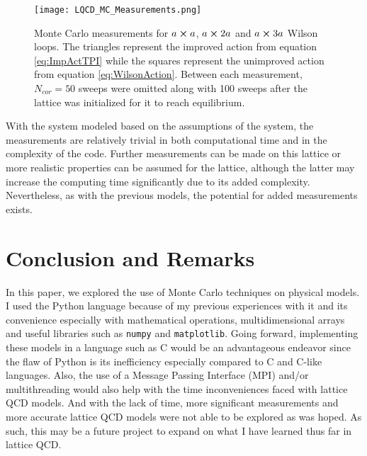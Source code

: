 \documentclass[11pt]{article}
\begin{document}
\begin{figure}[h!]
	\centering
	\texttt{[image: LQCD\_MC\_Measurements.png]}
	\caption{Monte Carlo measurements for $a\cross a$, $a\cross2a$ and $a\cross3a$ Wilson loops. The triangles represent the improved action from equation \ref{eq:ImpActTPI} while the squares represent the unimproved action from equation \ref{eq:WilsonAction}. Between each measurement, $N_{cor}=50$ sweeps were omitted along with 100 sweeps after the lattice was initialized for it to reach equilibrium.}
	\label{fig:LQCDPlot}
\end{figure}

With the system modeled based on the assumptions of the system, the measurements are relatively trivial in both computational time and in the complexity of the code. Further measurements can be made on this lattice or more realistic properties can be assumed for the lattice, although the latter may increase the computing time significantly due to its added complexity. Nevertheless, as with the previous models, the potential for added measurements exists.

\section{Conclusion and Remarks}
In this paper, we explored the use of Monte Carlo techniques on physical models. I used the Python language because of my previous experiences with it and its convenience especially with mathematical operations, multidimensional arrays and useful libraries such as \texttt{numpy} and \texttt{matplotlib}. Going forward, implementing these models in a language such as C would be an advantageous endeavor since the flaw of Python is its inefficiency especially compared to C and C-like languages. Also, the use of a Message Passing Interface (MPI) and/or multithreading would also help with the time inconveniences faced with lattice QCD models. And with the lack of time, more significant measurements and more accurate lattice QCD models were not able to be explored as was hoped. As such, this may be a future project to expand on what I have learned thus far in lattice QCD.
\end{document}
